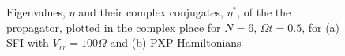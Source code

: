 \begin{figure}
  \centering
  \caption{Eigenvalues, $\eta$ and their complex conjugates, $\eta^*$,
    of the the propagator, plotted in the complex place for $N=6$,
    $\Omega t=0.5$, for (a) SFI with $V_{rr}=100\Omega$ and (b) PXP
    Hamiltonians}
\end{figure}

